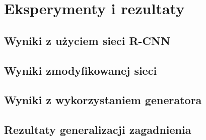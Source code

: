 \chapter{Eksperymenty i rezultaty}

\section{Wyniki z użyciem sieci R-CNN}

\section{Wyniki zmodyfikowanej sieci}

\section{Wyniki z wykorzystaniem generatora}

\section{Rezultaty generalizacji zagadnienia}
